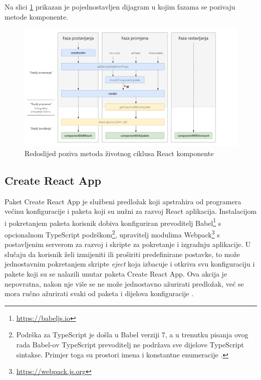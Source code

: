 \documentclass[times, utf8, diplomski, numeric]{fer}
\newcommand{\razmakp}{\vspace{18pt}}
\newcommand{\razmaks}{\vspace{10pt}}
\begin{document}
Na slici \ref{fig:react_lifecycle} prikazan je pojednostavljen dijagram u kojim fazama se pozivaju metode komponente.

\begin{figure}[!htb] %
  \centering
  \includegraphics[width=15.6cm]{images/react_life.png}
  \caption{Redoslijed poziva metoda životnog ciklusa React komponente}
  \label{fig:react_lifecycle}
  \razmakp
\end{figure}


\razmaks
\subsection{Create React App} \label{sec:cra}

Paket Create React App je službeni predložak koji apstrahira od programera većinu konfiguracije i paketa koji su nužni za razvoj React aplikacija.
Instalacijom i pokretanjem paketa korisnik dobiva konfiguriran prevoditelj Babel\footnote{\url{https://babeljs.io}} s opcionalnom TypeScript podrškom\footnote{
    Podrška za TypeScript je došla u Babel verziji 7, a u trenutku pisanja ovog rada Babel-ov TypeScript prevoditelj ne podržava sve dijelove TypeScript sintakse. Primjer toga su prostori imena  i konstantne enumeracije  \citep{ms_dev_babel}.
}, upravitelj modulima Webpack\footnote{\url{https://webpack.js.org}} s postavljenim serverom za razvoj i skripte za pokretanje i izgradnju aplikacije.
U slučaju da korisnik želi izmijeniti ili proširiti predefinirane postavke, to može jednostavnim pokretanjem skripte \emph{eject} koja izbacuje i otkriva svu konfiguraciju i pakete koji su se nalazili unutar paketa Create React App.
Ova akcija je nepovratna, nakon nje više se ne može jednostavno ažurirati predložak, već se mora ručno ažurirati svaki od paketa i dijelova konfiguracije \citep{gh_cra}.
\end{document}
